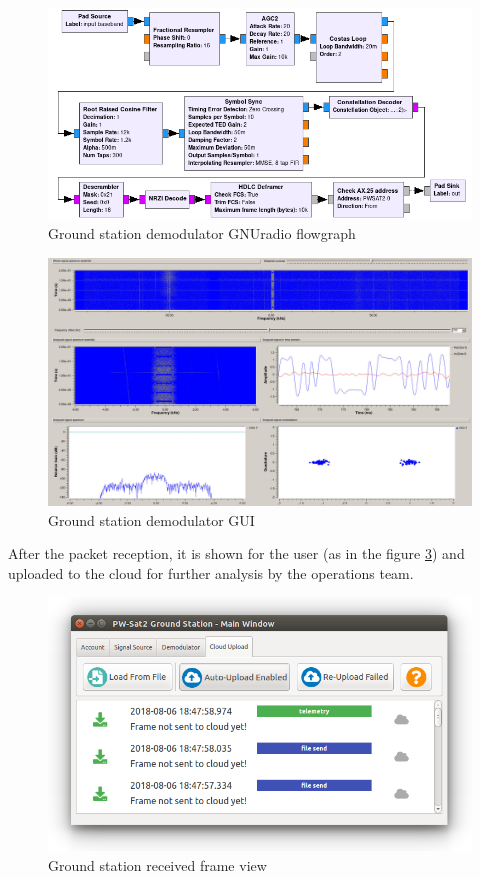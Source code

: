 \begin{figure}[H]
    \centering
    \includegraphics[width=0.7\paperwidth]{img/7/gs_demodulator_diagram.png}
    \caption{Ground station demodulator GNUradio flowgraph}
    \label{gs_demodulator_diagram}
\end{figure}

\begin{figure}[H]
    \centering
    \includegraphics[width=0.7\paperwidth]{img/7/gs_demodulator_gui.jpg}
    \caption{Ground station demodulator GUI}
    \label{gs_demodulator_gui}
\end{figure}

After the packet reception, it is shown for the user (as in the figure \ref{gs_frame_view}) and uploaded to the cloud for further analysis by the operations team.

\begin{figure}[H]
    \centering
    \includegraphics[width=0.6\paperwidth]{img/7/gs_frame_view.png}
    \caption{Ground station received frame view}
    \label{gs_frame_view}
\end{figure}


